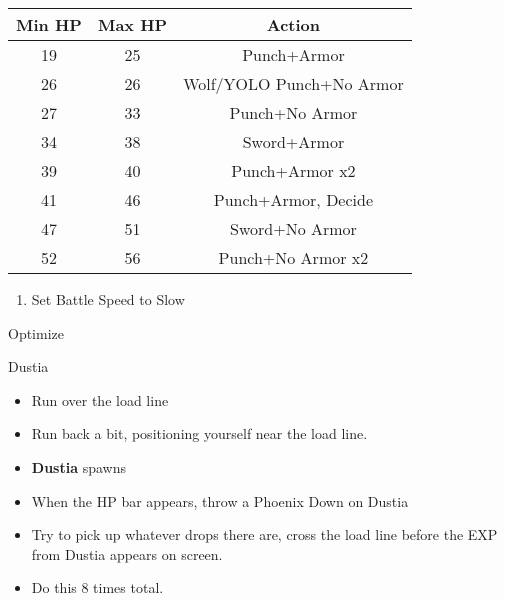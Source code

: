\begin{center}
	\begin{tabular}{|c|c|c|} \hline
	Min HP & Max HP & Action \\ \hline
	      19	& 25&	Punch+Armor\\ \hline
	      26	&26	&Wolf/YOLO Punch+No Armor\\ \hline
	      27	&33	&Punch+No Armor\\ \hline
	      34	&38	&Sword+Armor\\ \hline
	      39	&40	&Punch+Armor x2\\ \hline
	      41	&46	&Punch+Armor, Decide\\ \hline
	      47	&51	&Sword+No Armor\\ \hline
	      52	&56&	Punch+No Armor x2\\ \hline
	\end{tabular}
\end{center}
\begin{enumerate}
	\item Set Battle Speed to Slow
\end{enumerate}
\begin{equip}
	\begin{itemize}
		\vaanf Optimize
	\end{itemize}
\end{equip}
\begin{battle}{Dustia}
	\begin{itemize}
		\item Run over the load line
		\item Run back a bit, positioning yourself near the load line.
		\item \textbf{Dustia} spawns
		\item When the HP bar appears, throw a Phoenix Down on Dustia
		\item Try to pick up whatever drops there are, cross the load line before the EXP from Dustia appears on screen.
		\item Do this 8 times total.
	\end{itemize}
\end{battle}
